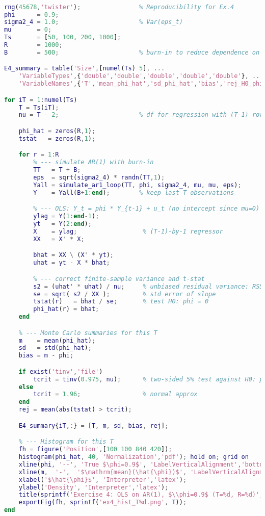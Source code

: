 \documentclass[dvipsnames,11pt]{article}
\begin{document}
\begin{solution}
\begin{lstlisting}[language=Matlab]
% Empirical distribution of OLS AR(1) with phi = 0.9 over varying T

rng(45678,'twister');                % Reproducibility for Ex.4
phi      = 0.9;
sigma2_4 = 1.0;                      % Var(eps_t)
mu       = 0;
Ts       = [50, 100, 200, 1000];
R        = 1000;
B        = 500;                      % burn-in to reduce dependence on start

E4_summary = table('Size',[numel(Ts) 5], ...
    'VariableTypes',{'double','double','double','double','double'}, ...
    'VariableNames',{'T','mean_phi_hat','sd_phi_hat','bias','rej_H0_phi0_rate'});

for iT = 1:numel(Ts)
    T = Ts(iT);
    nu = T - 2;                      % df for regression with (T-1) rows, 1 slope

    phi_hat = zeros(R,1);
    tstat   = zeros(R,1);

    for r = 1:R
        % --- simulate AR(1) with burn-in
        TT   = T + B;
        eps  = sqrt(sigma2_4) * randn(TT,1);
        Yall = simulate_ar1_loop(TT, phi, sigma2_4, mu, mu, eps);
        Y    = Yall(B+1:end);        % keep last T observations

        % --- OLS: Y_t = phi * Y_{t-1} + u_t (no intercept since mu=0)
        ylag = Y(1:end-1); 
        yt   = Y(2:end);
        X    = ylag;                  % (T-1)-by-1 regressor
        XX   = X' * X;

        bhat = XX \ (X' * yt);
        uhat = yt - X * bhat;

        % --- correct finite-sample variance and t-stat
        s2 = (uhat' * uhat) / nu;     % unbiased residual variance: RSS/(T-2)
        se = sqrt( s2 / XX );         % std error of slope
        tstat(r)   = bhat / se;       % test H0: phi = 0
        phi_hat(r) = bhat;
    end

    % --- Monte Carlo summaries for this T
    m    = mean(phi_hat);
    sd   = std(phi_hat);
    bias = m - phi;

    if exist('tinv','file')
        tcrit = tinv(0.975, nu);      % two-sided 5% test against H0: phi = 0
    else
        tcrit = 1.96;                 % normal approx
    end
    rej = mean(abs(tstat) > tcrit);

    E4_summary{iT,:} = [T, m, sd, bias, rej];

    % --- Histogram for this T
    fh = figure('Position',[100 100 840 420]);
    histogram(phi_hat, 40, 'Normalization','pdf'); hold on; grid on
    xline(phi, '--', 'True $\phi=0.9$', 'LabelVerticalAlignment','bottom', 'Interpreter','latex');
    xline(m,  '-',  '$\mathrm{mean}(\hat{\phi})$', 'LabelVerticalAlignment','bottom', 'Interpreter','latex');
    xlabel('$\hat{\phi}$', 'Interpreter','latex'); 
    ylabel('Density', 'Interpreter','latex');
    title(sprintf('Exercise 4: OLS on AR(1), $\\phi=0.9$ (T=%d, R=%d)', T, R), 'Interpreter','latex');
    exportFig(fh, sprintf('ex4_hist_T%d.png', T));
end


\end{lstlisting}
\end{solution}
\end{document}
